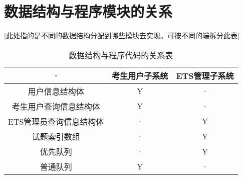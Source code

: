 \section{数据结构与程序模块的关系}
[此处指的是不同的数据结构分配到哪些模块去实现。可按不同的端拆分此表]
\begin{table}[htbp]
\centering
\caption{数据结构与程序代码的关系表} \label{tab:datastructure-module}
\begin{tabular}{|c|c|c|}
    \hline
    · & 考生用户子系统 & ETS管理子系统 \\
    \hline
    用户信息结构体 & Y & · \\
    \hline
    考生用户查询信息结构体 & Y & · \\
    \hline
    ETS管理员查询信息结构体 & · & Y \\
    \hline
    试题索引数组 & · & Y \\
    \hline
    优先队列 & · & Y \\
    \hline
    普通队列 & Y & · \\
    \hline
\end{tabular}
\end{table}